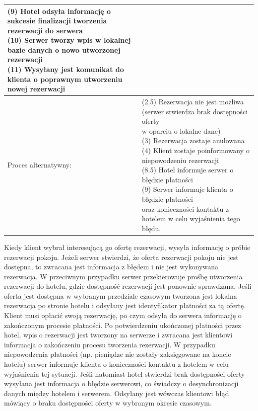 \documentclass{article}
\begin{document}
\begin{flushleft}
{\begin{tabular}{|l|l|}
{(9) Hotel odsyła informację o sukcesie finalizacji tworzenia rezerwacji do serwera \\
(10) Serwer tworzy wpis w lokalnej bazie danych o nowo utworzonej rezerwacji \\
(11) Wysyłany jest komunikat do klienta o poprawnym utworzeniu nowej rezerwacji }\\
\hline
Proces alternatywny: & \makecell[l]{(2.5) Rezerwacja nie jest możliwa (serwer stwierdza brak dostępności oferty\\w oparciu o lokalne dane)\\
(3) Rezerwacja zostaje anulowana\\
(4) Klient zostaje poinformowany o niepowodzeniu rezerwacji\\
(8.5) Hotel informuje serwer o błędzie płatności\\
(9) Serwer informuje klienta o błędzie płatności\\ oraz konieczności kontaktu z hotelem w celu wyjaśnienia tego błędu.
}\\
\hline
\end{tabular}}
\end{flushleft}

Kiedy klient wybrał interesującą go ofertę rezerwacji, wysyła informację o próbie rezerwacji pokoju. Jeżeli serwer stwierdzi, że oferta rezerwacji pokoju nie jest dostępna, to zwracana jest informacja z błędem i nie jest wykonywana rezerwacja. W przeciwnym przypadku serwer przekierowuje prośbę utworzenia rezerwacji do hotelu, gdzie dostępność rezerwacji jest ponownie sprawdzana. Jeśli oferta jest dostępna w wybranym przedziale czasowym tworzona jest lokalna rezerwacja po stronie hotelu i odsyłany jest identyfikator płatności za tą ofertę. Klient musi opłacić swoją rezerwację, po czym odsyła do serwera informację o zakończonym procesie płatności. Po potwierdzeniu ukończonej płatności przez hotel, wpis o rezerwacji jest tworzony na serwerze i zwracana jest klientowi informacja o zakończeniu procesu tworzenia rezerwacji. W przypadku niepowodzenia płatności (np. pieniądze nie zostały zaksięgowane na koncie hotelu) serwer informuje klienta o konieczności kontaktu z hotelem w celu wyjaśnienia tej sytuacji. Jeśli natomiast hotel stwierdzi brak dostępności oferty wysyłana jest informacja o błędzie serwerowi, co świadczy o desynchronizacji danych między hotelem i serwerem. Odsyłany jest wówczas klientowi błąd mówiący o braku dostępności oferty w wybranym okresie czasowym.
\end{document}
